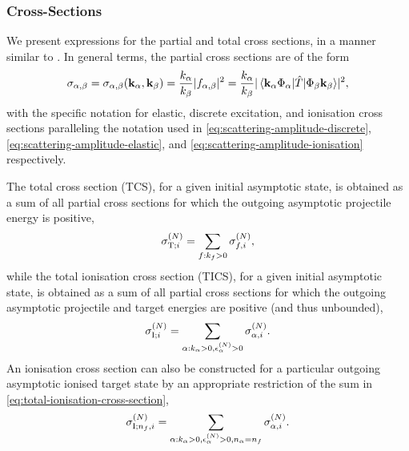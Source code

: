 \documentclass[]{article}
\begin{document}
\subsubsection{Cross-Sections}
\label{sec:th-ccc-cs}

We present expressions for the partial and total cross sections, in a manner
similar to \cite[10]{BRAY19951}.
In general terms, the partial cross sections are of the form
\begin{equation}
  \label{eq:partial-cross-sections}
  \sigma_{\alpha, \beta}
  =
  \sigma_{\alpha, \beta}(\vb{k}_{\alpha}, \vb{k}_{\beta})
  =
  \dfrac{k_{\alpha}}{k_{\beta}}
  \lvert f_{\alpha, \beta}\rvert^{2}
  =
  \dfrac{k_{\alpha}}{k_{\beta}}
  \lvert
    \mel*
    {\vb{k}_{\alpha} \Phi_{\alpha}}
    {\hat{T}}
    {\Phi_{\beta} \vb{k}_{\beta}}
  \rvert^{2}
  ,
\end{equation}
with the specific notation for elastic, discrete excitation, and ionisation
cross sections paralleling the notation used in
\eqref{eq:scattering-amplitude-discrete},
\eqref{eq:scattering-amplitude-elastic}, and
\eqref{eq:scattering-amplitude-ionisation} respectively.

The total cross section (TCS), for a given initial asymptotic state, is obtained
as a sum of all partial cross sections for which the outgoing asymptotic
projectile energy is positive,
\begin{equation}
  \label{eq:total-cross-section}
  \sigma_{\mathrm{T}; i}^{(N)}
  =
  \sum_{f : k_{f} > 0}
  \sigma_{f, i}^{(N)}
  ,
\end{equation}
while the total ionisation cross section (TICS), for a given initial asymptotic
state, is obtained as a sum of all partial cross sections for which the outgoing
asymptotic projectile and target energies are positive (and thus unbounded),
\begin{equation}
  \label{eq:total-ionisation-cross-section}
  \sigma_{\mathrm{I}; i}^{(N)}
  =
  \sum_{\alpha : k_{\alpha} > 0, \epsilon_{\alpha}^{(N)} > 0}
  \sigma_{\alpha, i}^{(N)}
  .
\end{equation}
An ionisation cross section can also be constructed for a particular outgoing
asymptotic ionised target state by an appropriate
restriction of the sum in \eqref{eq:total-ionisation-cross-section},
\begin{equation}
  \label{eq:partial-ionisation-cross-section}
  \sigma_{\mathrm{I}; n_{f}, i}^{(N)}
  =
  \sum_{\alpha :
    k_{\alpha} > 0
    ,
    \epsilon_{\alpha}^{(N)} > 0
    ,
    n_{\alpha} = n_{f}
  }
  \sigma_{\alpha, i}^{(N)}
  .
\end{equation}
\end{document}
